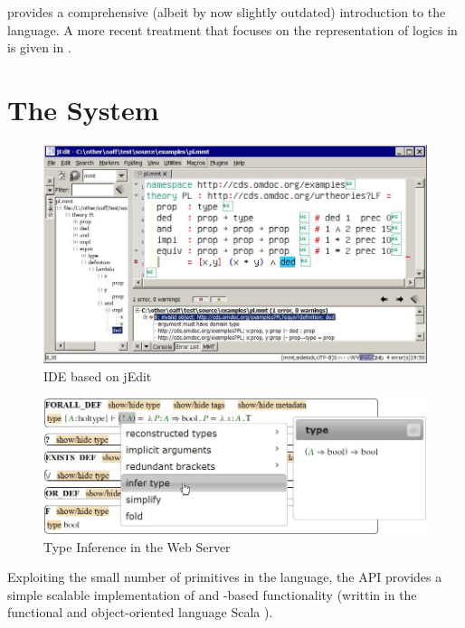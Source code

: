 \cite{RK:mmt:10} provides a comprehensive (albeit by now slightly outdated) introduction to the \mmt language.
A more recent treatment that focuses on the representation of logics in \mmt is given in \cite{rabe:howto:14}.

\section{The \mmt System}\label{sec:mmtsys}

\begin{figure}[htb]
\begin{center}
\includegraphics[width=\textwidth]{img/jedit-sidebar-errors.jpg}
\end{center}
\caption{\mmt IDE based on jEdit}\label{fig:jedit}
\end{figure}

\begin{figure}[htb]
\begin{center}
\includegraphics[width=\textwidth]{img/type-inference.jpg}
\end{center}
\caption{Type Inference in the \mmt Web Server}\label{fig:web}
\end{figure}

Exploiting the small number of primitives in the {\mmt} language, the {\mmt} API provides a simple scalable implementation of {\mmt} and {\mmt}-based functionality (writtin in the functional and object-oriented language Scala \cite{scala}).

